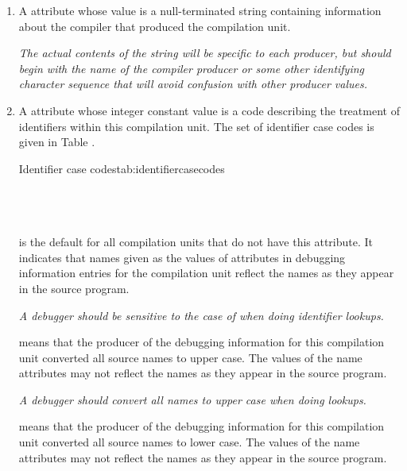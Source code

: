 \begin{enumerate}[1. ]
\item  \hypertarget{chap:DWATproducercompileridentification}{}
A \DWATproducerDEFN{} attribute
whose value is a null-terminated string containing 
information about the compiler that produced the compilation unit. 

\textit{The actual contents of
the string will be specific to each producer, but should
begin with the name of the compiler 
\bb
producer 
\eb
or some other
identifying character sequence that will avoid confusion
with other producer values.}

\item  \hypertarget{chap:DWATidentifiercaseidentifiercaserule}{}
A \DWATidentifiercaseDEFN{} attribute 
 whose integer
constant value is a code describing the treatment
of identifiers within this compilation unit. The
set of identifier case codes is given in
Table .

\begin{simplenametable}{Identifier case codes}{tab:identifiercasecodes}
\DWIDcasesensitive{}      \\
\DWIDupcase{}             \\
\DWIDdowncase{}           \\
\DWIDcaseinsensitive{}    \\
\end{simplenametable}

\DWIDcasesensitiveTARG{} is the default for all compilation units
that do not have this attribute.  It indicates that names given
as the values of \DWATname{} attributes 
in debugging information
entries for the compilation unit reflect the names as they
appear in the source program. 

\textit{A debugger should be sensitive
to the case of  when doing identifier 
lookups.}

\DWIDupcaseTARG{} means that the 
producer of the debugging
information for this compilation unit converted all source
names to upper case. The values of the name attributes may not
reflect the names as they appear in the source program. 

\textit{A debugger should convert all names to upper case 
when doing lookups.}

\DWIDdowncaseTARG{} means that the producer of the debugging
information for this compilation unit converted all source
names to lower case. The values of the name attributes may not
reflect the names as they appear in the source program. 


\end{enumerate}
